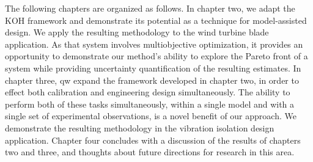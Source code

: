 \documentclass[12pt]{article}
\begin{document}
The following chapters are organized as follows.
In chapter two, we adapt the KOH framework and demonstrate its potential as a technique for model-assisted design.
We apply the resulting methodology to the wind turbine blade application.
As that system involves multiobjective optimization, it provides an opportunity to demonstrate our method's ability to explore the Pareto front of a system while providing uncertainty quantification of the resulting estimates.
In chapter three, qw expand the framework developed in chapter two, in order to effect both calibration and engineering design simultaneously.
The ability to perform both of these tasks simultaneously, within a single model and with a single set of experimental observations, is a novel benefit of our approach.
We demonstrate the resulting methodology in the vibration isolation design application.
Chapter four concludes with a discussion of the results of chapters two and three, and thoughts about future directions for research in this area.




	
\end{document}
